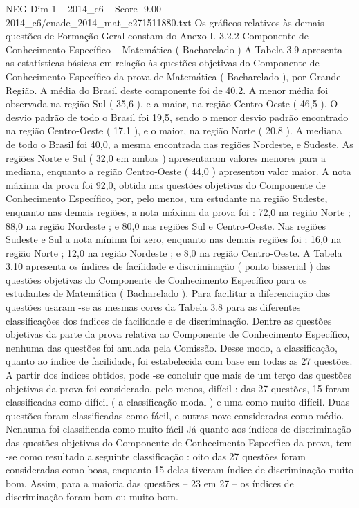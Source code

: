 \begin{textsample}{NEG Dim 1 – 2014\_c6 – Score -9.00 – 2014\_c6/enade\_2014\_mat\_c271511880.txt}
Os gráficos relativos às demais questões de Formação Geral constam do Anexo I. 3.2.2 Componente de Conhecimento Específico – Matemática ( Bacharelado ) A Tabela 3.9 apresenta as estatísticas básicas em relação às questões objetivas do Componente de Conhecimento Específico da prova de Matemática ( Bacharelado ), por Grande Região.
A média do Brasil deste componente foi de 40,2.
A menor média foi observada na região Sul ( 35,6 ), e a maior, na região Centro-Oeste ( 46,5 ).
O desvio padrão de todo o Brasil foi 19,5, sendo o menor desvio padrão encontrado na região Centro-Oeste ( 17,1 ), e o maior, na região Norte ( 20,8 ).
A mediana de todo o Brasil foi 40,0, a mesma encontrada nas regiões Nordeste, e Sudeste.
As regiões Norte e Sul ( 32,0 em ambas ) apresentaram valores menores para a mediana, enquanto a região Centro-Oeste ( 44,0 ) apresentou valor maior.
A nota máxima da prova foi 92,0, obtida nas questões objetivas do Componente de Conhecimento Específico, por, pelo menos, um estudante na região Sudeste, enquanto nas demais regiões, a nota máxima da prova foi : 72,0 na região Norte ; 88,0 na região Nordeste ; e 80,0 nas regiões Sul e Centro-Oeste.
Nas regiões Sudeste e Sul a nota mínima foi zero, enquanto nas demais regiões foi : 16,0 na região Norte ; 12,0 na região Nordeste ; e 8,0 na região Centro-Oeste.
A Tabela 3.10 apresenta os índices de facilidade e discriminação ( ponto bisserial ) das questões objetivas do Componente de Conhecimento Específico para os estudantes de Matemática ( Bacharelado ).
Para facilitar a diferenciação das questões usaram -se as mesmas cores da Tabela 3.8 para as diferentes classificações dos índices de facilidade e de discriminação.
Dentre as questões objetivas da parte da prova relativa ao Componente de Conhecimento Específico, nenhuma das questões foi anulada pela Comissão.
Desse modo, a classificação, quanto ao índice de facilidade, foi estabelecida com base em todas as 27 questões.
A partir dos índices obtidos, pode -se concluir que mais de um terço das questões objetivas da prova foi considerado, pelo menos, difícil : das 27 questões, 15 foram classificadas como difícil ( a classificação modal ) e uma como muito difícil.
Duas questões foram classificadas como fácil, e outras nove consideradas como médio.
Nenhuma foi classificada como muito fácil Já quanto aos índices de discriminação das questões objetivas do Componente de Conhecimento Específico da prova, tem -se como resultado a seguinte classificação : oito das 27 questões foram consideradas como boas, enquanto 15 delas tiveram índice de discriminação muito bom.
Assim, para a maioria das questões – 23 em 27 – os índices de discriminação foram bom ou muito bom.

\end{textsample}
